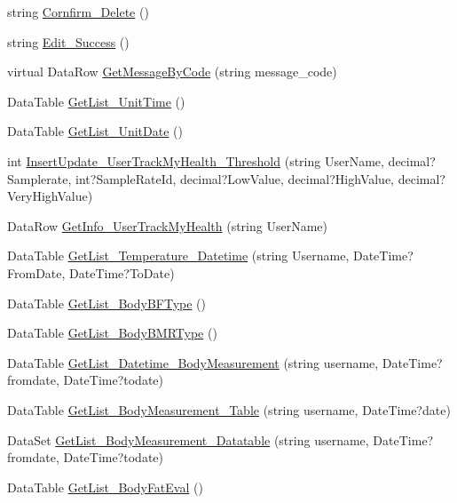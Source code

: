 \begin{DoxyCompactItemize}
\item 
string \hyperlink{class_d_b_class_aa1a72fda8621249f462071e883d14ead}{Cornfirm\-\_\-\-Delete} ()
\item 
string \hyperlink{class_d_b_class_a29ee46245e52b057a2a7e0d42cc72307}{Edit\-\_\-\-Success} ()
\item 
virtual Data\-Row \hyperlink{class_d_b_class_a101e80735fe6e717d5763d53eb772793}{Get\-Message\-By\-Code} (string message\-\_\-code)
\item 
Data\-Table \hyperlink{class_d_b_class_ab0a19e84d20ad1d00da1f6f2239153b3}{Get\-List\-\_\-\-Unit\-Time} ()
\item 
Data\-Table \hyperlink{class_d_b_class_aa17c75e306a63775128a29aa3682b98b}{Get\-List\-\_\-\-Unit\-Date} ()
\item 
int \hyperlink{class_d_b_class_ad222e776de0cc554f15903c20bd672f0}{Insert\-Update\-\_\-\-User\-Track\-My\-Health\-\_\-\-Threshold} (string User\-Name, decimal?Samplerate, int?Sample\-Rate\-Id, decimal?Low\-Value, decimal?High\-Value, decimal?Very\-High\-Value)
\item 
Data\-Row \hyperlink{class_d_b_class_ad9671a70651f9956eec03dbb5de3859e}{Get\-Info\-\_\-\-User\-Track\-My\-Health} (string User\-Name)
\item 
Data\-Table \hyperlink{class_d_b_class_af3711e9da9e4cc100a375496842590f5}{Get\-List\-\_\-\-Temperature\-\_\-\-Datetime} (string Username, Date\-Time?From\-Date, Date\-Time?To\-Date)
\item 
Data\-Table \hyperlink{class_d_b_class_a9bad7290fc0114ab60d343157dee22b1}{Get\-List\-\_\-\-Body\-B\-F\-Type} ()
\item 
Data\-Table \hyperlink{class_d_b_class_aa2a657479fe0ef609218bce4530f53ba}{Get\-List\-\_\-\-Body\-B\-M\-R\-Type} ()
\item 
Data\-Table \hyperlink{class_d_b_class_a0af97a662055ff2a3a41bcc3a28beaea}{Get\-List\-\_\-\-Datetime\-\_\-\-Body\-Measurement} (string username, Date\-Time?fromdate, Date\-Time?todate)
\item 
Data\-Table \hyperlink{class_d_b_class_ac3ab5f6a5dddad118d2a63c41b0b9f02}{Get\-List\-\_\-\-Body\-Measurement\-\_\-\-Table} (string username, Date\-Time?date)
\item 
Data\-Set \hyperlink{class_d_b_class_a416e75f38a46c9ab6607c740e175854f}{Get\-List\-\_\-\-Body\-Measurement\-\_\-\-Datatable} (string username, Date\-Time?fromdate, Date\-Time?todate)
\item 
Data\-Table \hyperlink{class_d_b_class_a0aabc831282182370eed262235495d33}{Get\-List\-\_\-\-Body\-Fat\-Eval} ()

\end{DoxyCompactItemize}
